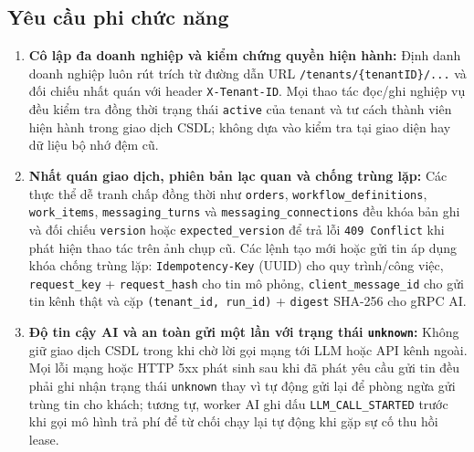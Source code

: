 \subsection{Yêu cầu phi chức năng}
\begin{enumerate}
  \item \textbf{Cô lập đa doanh nghiệp và kiểm chứng quyền hiện hành:} Định danh doanh nghiệp luôn rút trích từ đường dẫn URL \texttt{/tenants/\hspace{0pt}\{tenantID\}/...} và đối chiếu nhất quán với header \texttt{X-\hspace{0pt}Tenant-\hspace{0pt}ID}.
    Mọi thao tác đọc/ghi nghiệp vụ đều kiểm tra đồng thời trạng thái \texttt{active} của tenant và tư cách thành viên hiện hành trong giao dịch CSDL; không dựa vào kiểm tra tại giao diện hay dữ liệu bộ nhớ đệm cũ.
  \item \textbf{Nhất quán giao dịch, phiên bản lạc quan và chống trùng lặp:} Các thực thể dễ tranh chấp đồng thời như \texttt{orders}, \texttt{workflow\_\hspace{0pt}definitions}, \texttt{work\_\hspace{0pt}items}, \texttt{messaging\_\hspace{0pt}turns} và \texttt{messaging\_\hspace{0pt}connections} đều khóa bản ghi và đối chiếu \texttt{version} hoặc \texttt{expected\_\hspace{0pt}version} để trả lỗi \texttt{409 Conflict} khi phát hiện thao tác trên ảnh chụp cũ.
    Các lệnh tạo mới hoặc gửi tin áp dụng khóa chống trùng lặp: \texttt{Idempotency-\hspace{0pt}Key} (UUID) cho quy trình/công việc, \texttt{request\_\hspace{0pt}key} + \texttt{request\_\hspace{0pt}hash} cho tin mô phỏng, \texttt{client\_\hspace{0pt}message\_\hspace{0pt}id} cho gửi tin kênh thật và cặp \texttt{(tenant\_\hspace{0pt}id, run\_\hspace{0pt}id)} + \texttt{digest} SHA-256 cho gRPC AI.
  \item \textbf{Độ tin cậy AI và an toàn gửi một lần với trạng thái \texttt{unknown}:} Không giữ giao dịch CSDL trong khi chờ lời gọi mạng tới LLM hoặc API kênh ngoài.
    Mọi lỗi mạng hoặc HTTP 5xx phát sinh sau khi đã phát yêu cầu gửi tin đều phải ghi nhận trạng thái \texttt{unknown} thay vì tự động gửi lại để phòng ngừa gửi trùng tin cho khách; tương tự, worker AI ghi dấu \texttt{LLM\_\hspace{0pt}CALL\_\hspace{0pt}STARTED} trước khi gọi mô hình trả phí để từ chối chạy lại tự động khi gặp sự cố thu hồi lease.

\end{enumerate}

